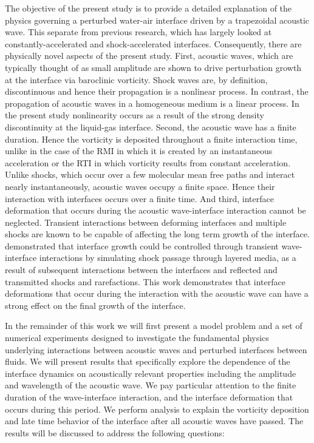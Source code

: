 The objective of the present study is to provide a detailed
explanation of the physics governing a perturbed water-air interface
driven by a trapezoidal acoustic wave. This separate from previous
research, which has largely looked at constantly-accelerated and
shock-accelerated interfaces. Consequently, there are physically novel
aspects of the present study.  First, acoustic waves, which are
typically thought of as small amplitude are shown to drive
perturbation growth at the interface via baroclinic vorticity. Shock
waves are, by definition, discontinuous and hence their propagation is
a nonlinear process. In contrast, the propagation of acoustic waves in
a homogeneous medium is a linear process. In the present study
nonlinearity occurs as a result of the strong density discontinuity at
the liquid-gas interface. Second, the acoustic wave has a finite
duration. Hence the vorticity is deposited throughout a finite
interaction time, unlike in the case of the \ac{RMI} in which it is
created by an instantaneous acceleration or the \ac{RTI} in which
vorticity results from constant acceleration. Unlike shocks, which
occur over a few molecular mean free paths and interact nearly
instantaneously, acoustic waves occupy a finite space. Hence their
interaction with interfaces occurs over a finite time. And third,
interface deformation that occurs during the acoustic wave-interface
interaction cannot be neglected. Transient interactions between
deforming interfaces and multiple shocks are known to be capable of
affecting the long term growth of the
interface. \cite{HenrydeFrahan2015b} demonstrated that interface
growth could be controlled through transient wave-interface
interactions by simulating shock passage through layered media, as a
result of subsequent interactions between the interfaces and reflected
and transmitted shocks and rarefactions. This work demonstrates that
interface deformations that occur during the interaction with the
acoustic wave can have a strong effect on the final growth of the
interface.

In the remainder of this work we will first present a model problem
and a set of numerical experiments designed to investigate the
fundamental physics underlying interactions between acoustic waves and
perturbed interfaces between fluids. We will present results that
specifically explore the dependence of the interface dynamics on
acoustically relevant properties including the amplitude and
wavelength of the acoustic wave. We pay particular attention to the
finite duration of the wave-interface interaction, and the interface
deformation that occurs during this period. We perform analysis to
explain the vorticity deposition and late time behavior of the
interface after all acoustic waves have passed. The results will be
discussed to address the following questions:

